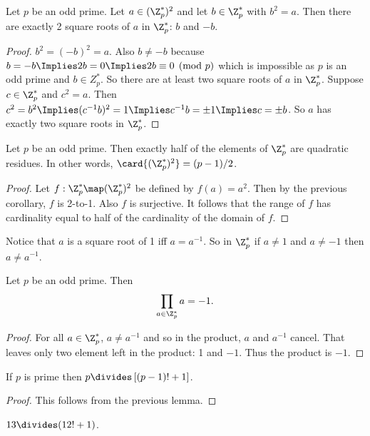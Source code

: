 \documentclass[oneside,12pt]{amsart}
\begin{document}
\begin{corollary}
Let $p$ be an odd prime. Let  $a\in(\Z^*_p)^2$ and let $b\in\Z^*_p$ with $b^2=a$. Then there are exactly 2 square roots of $a$ in $\Z^*_p$:
$b$ and $-b$.
\end{corollary}
\begin{proof}
$b^2 = (-b)^2 = a$. Also $b\not= -b$ because $b=-b\Implies 2b = 0 \Implies 2b \equiv 0 \pmod{p}$ which is impossible as $p$ is an odd prime
and $b\in Z^*_p$. So there are at least two square roots of $a$ in $\Z^*_p$. Suppose $c\in\Z^*_p$ and $c^2=a$. Then 
$c^2=b^2 \Implies (c^{-1}b)^2 = 1 \Implies c^{-1}b = \pm 1 \Implies c = \pm b$. So $a$ has exactly two square roots in $\Z^*_p$.
\end{proof}

\begin{corollary}
Let $p$ be an odd prime. Then exactly half of the elements of $\Z^*_p$ are quadratic residues. In other words,
$\card{(\Z^*_p)^2} = (p-1)/2$.
\end{corollary}
\begin{proof}
Let $f:\Z^*_p \map (\Z^*_p)^2$ be defined by $f(a) = a^2$. Then by the previous corollary, $f$ is 2-to-1. Also $f$ is surjective.
It follows that the range of $f$ has cardinality equal to half of the cardinality of the domain of $f$.
\end{proof}

Notice that $a$ is a square root of 1 iff $a = a^{-1}$. So in $\Z^*_p$ if $a\not=1$ and $a\not=-1$ then $a\not= a^{-1}$.

\begin{lemma}
Let $p$ be an odd prime. Then
$$\prod_{a\in\Z^*_p} a = -1.$$
\end{lemma}
\begin{proof}
For all $a\in\Z^*_p$, $a\not= a^{-1}$ and so in the product, $a$ and $a^{-1}$ cancel. That leaves only two element
left in the product: 1 and $-1$. Thus the product is $-1$.
\end{proof}

\begin{theorem}
If $p$ is prime then $p \divides \left[(p-1)! + 1 \right]$.
\end{theorem}
\begin{proof}
This follows from the previous lemma.
\end{proof}

\begin{in_class_example}
$13\divides (12! + 1)$.
\end{in_class_example}
\end{document}
